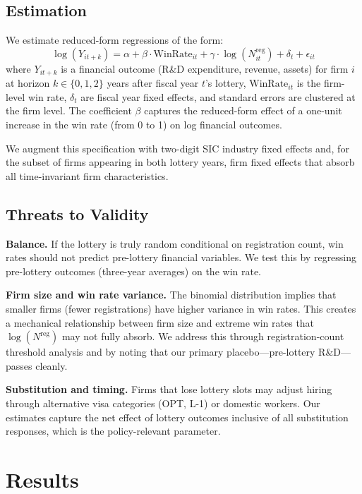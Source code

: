 \documentclass[12pt]{article}
\begin{document}
\subsection{Estimation}

We estimate reduced-form regressions of the form:
\begin{equation}
\log(Y_{it+k}) = \alpha + \beta \cdot \text{WinRate}_{it} + \gamma \cdot \log(N_{it}^{\text{reg}}) + \delta_t + \epsilon_{it}
\label{eq:main}
\end{equation}
where $Y_{it+k}$ is a financial outcome (R\&D expenditure, revenue, assets) for firm $i$ at horizon $k \in \{0, 1, 2\}$ years after fiscal year $t$'s lottery, $\text{WinRate}_{it}$ is the firm-level win rate, $\delta_t$ are fiscal year fixed effects, and standard errors are clustered at the firm level. The coefficient $\beta$ captures the reduced-form effect of a one-unit increase in the win rate (from 0 to 1) on log financial outcomes.

We augment this specification with two-digit SIC industry fixed effects and, for the subset of firms appearing in both lottery years, firm fixed effects that absorb all time-invariant firm characteristics.

\subsection{Threats to Validity}

\textbf{Balance.} If the lottery is truly random conditional on registration count, win rates should not predict pre-lottery financial variables. We test this by regressing pre-lottery outcomes (three-year averages) on the win rate.

\textbf{Firm size and win rate variance.} The binomial distribution implies that smaller firms (fewer registrations) have higher variance in win rates. This creates a mechanical relationship between firm size and extreme win rates that $\log(N^{\text{reg}})$ may not fully absorb. We address this through registration-count threshold analysis and by noting that our primary placebo---pre-lottery R\&D---passes cleanly.

\textbf{Substitution and timing.} Firms that lose lottery slots may adjust hiring through alternative visa categories (OPT, L-1) or domestic workers. Our estimates capture the net effect of lottery outcomes inclusive of all substitution responses, which is the policy-relevant parameter.

\section{Results}
\label{sec:results}
\end{document}
